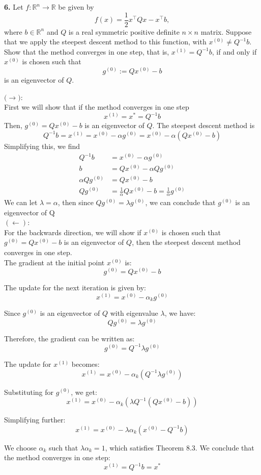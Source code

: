 \documentclass[12pt]{article}
\begin{document}
\begin{mybluebox}
  \textbf{6.} Let \( f : \mathbb{R}^n \to \mathbb{R} \) be given by
  \[
  f(x) = \frac{1}{2} x^\top Q x - x^\top b,
  \]
  where \( b \in \mathbb{R}^n \) and \( Q \) is a real symmetric positive definite \( n \times n \) matrix. Suppose that we apply the steepest descent method to this function, with \( x^{(0)} \neq Q^{-1} b \). Show that the method converges in one step, that is, \( x^{(1)} = Q^{-1} b \), if and only if \( x^{(0)} \) is chosen such that
  \[
  g^{(0)} := Q x^{(0)} - b
  \]
  is an eigenvector of \( Q \).  
\end{mybluebox}
$\mathbf(\rightarrow)$:\\
First we will show that if the method converges in one step
\[
x^{(1)} = x^*  = Q^{-1}b
\]
Then, $g^{(0)} = Qx^{(0)}-b$ is an eigenvector of $Q$. 
The steepest descent method is 
\[Q^{-1}b = x^{(1)} = x^{(0)}-\alpha g^{(0)} = x^{(0)}-\alpha( Q x^{(0)} - b)
\]
Simplifying this, we find 
\begin{align*}
  Q^{-1}b &= x^{(0)}-\alpha g^{(0)} \\
  b &= Qx^{(0)} - \alpha Q g^{(0)}\\
  \alpha Q g^{(0)} &= Qx^{(0)} - b \\
  Q g^{(0)} &= \frac{1}{\alpha} Qx^{(0)} - b = \frac{1}{\alpha} g^{(0)}
\end{align*}
We can let $\lambda = \alpha$, then since $Qg^{(0)} = \lambda g^{(0)}$, we can conclude that $g^{(0)}$
is an eigenvector of Q\\
$(\leftarrow)$:\\
For the backwards direction, we will show if $x^{(0)}$ is chosen such that $g^{(0)} = Qx^{(0)} - b$ is an eigenvector of $Q$, 
then the steepest descent method converges in one step. \\
The gradient at the initial point \( x^{(0)} \) is:
\[
g^{(0)} = Q x^{(0)} - b
\]

The update for the next iteration is given by:
\[
x^{(1)} = x^{(0)} - \alpha_k g^{(0)}
\]

Since \( g^{(0)} \) is an eigenvector of \( Q \) with eigenvalue \( \lambda \), we have:
\[
Q g^{(0)} = \lambda g^{(0)}
\]

Therefore, the gradient can be written as:
\[
g^{(0)} = Q^{-1} \lambda g^{(0)}
\]

The update for \( x^{(1)} \) becomes:
\[
x^{(1)} = x^{(0)} - \alpha_k \left( Q^{-1} \lambda g^{(0)} \right)
\]

Substituting for \( g^{(0)} \), we get:
\[
x^{(1)} = x^{(0)} - \alpha_k \left( \lambda Q^{-1} (Q x^{(0)} - b) \right)
\]

Simplifying further:
\[
x^{(1)} = x^{(0)} - \lambda \alpha_k \left( x^{(0)} - Q^{-1} b \right)
\]

We choose \( \alpha_k \) such that \( \lambda \alpha_k = 1 \), which satisfies Theorem 8.3. We conclude that the method converges in one step:
\[
x^{(1)} = Q^{-1} b = x^*
\]
\end{document}
